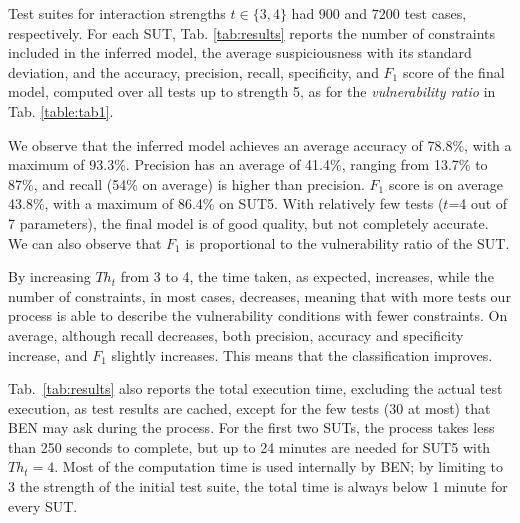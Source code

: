 \begin{tikzborder}{\cite{Gargantini16:validation}}
\begin{tikzborder}{\cite{gargantini_combinatorial_2017}}
\begin{tikzborder}{\cite{gargantini_combinatorial_2017}}
\begin{tikzborder}{\cite{garn2019}}
\bb Test suites for interaction strengths $t \in \lbrace 3,4\rbrace$ had $900$ and $7200$ test cases, respectively.
For each SUT, Tab. \ref{tab:results} reports the number of constraints included in the inferred model, the average suspiciousness with its standard deviation,
and the accuracy, precision, recall, specificity, and $F_1$ score of the final model, computed over all tests up to strength 5, as for the \textit{vulnerability ratio} in Tab. \ref{table:tab1}.

We observe that the inferred model achieves an average accuracy of 78.8\%, with a maximum of 93.3\%. Precision has an average of 41.4\%, ranging from 13.7\% to 87\%, and
recall (54\% on average) %
is higher than precision. %
$F_1$ score is on average 43.8\%, with a maximum of 86.4\% on SUT5.
With relatively few tests ($t$=4 out of 7 parameters), the final model is of good quality, but not completely accurate.
We can also observe that $F_1$ is proportional to the vulnerability ratio of the SUT.

By increasing $Th_t$ from 3 to 4, the time taken, as expected, increases, while the number of constraints, in most cases, decreases, meaning that with more tests our process is able to describe the vulnerability conditions with fewer constraints.
On average, although recall decreases, both precision, accuracy and specificity increase, %
and $F_1$ slightly increases. This means that the classification %
improves.%

Tab.~\ref{tab:results} also reports the total execution time, excluding the actual test execution, as test results are cached, except for the few tests (30 at most) that BEN may ask during the process.
For the first two SUTs, the process takes less than 250 seconds to complete, but up to 24 minutes are needed for SUT5 with $Th_t=4$. 
Most of the computation time is used internally by BEN; by limiting to 3 the strength of the initial test suite, the total time is always below 1 minute for every SUT. %


\end{tikzborder}
\end{tikzborder}
\end{tikzborder}
\end{tikzborder}

